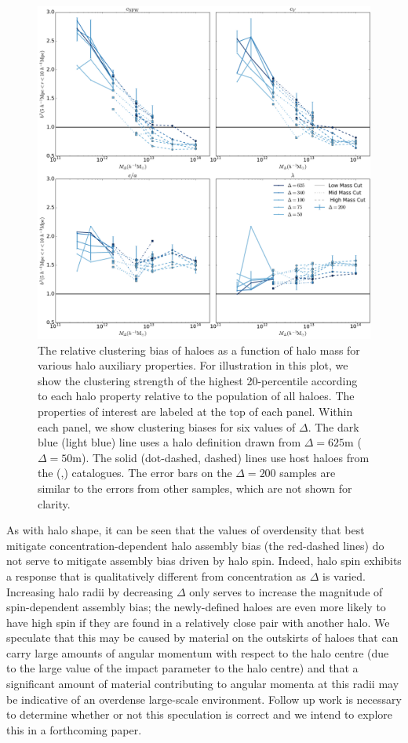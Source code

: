 \documentclass[usenatbib,fleqn]{mnras}
\begin{document}
\begin{figure}
	\centering
	\includegraphics[width=\textwidth]{biasplot.pdf}
	\caption{
The relative clustering bias of haloes as a function of halo mass for various halo auxiliary properties. For illustration in this plot, we show the clustering strength of the highest 20-percentile according to each halo property relative to the population of all haloes. The properties of interest are labeled at the top of each panel. Within each panel, we show clustering biases for six values of $\Delta$. The dark blue (light blue) line uses a halo definition drawn from $\Delta = 625$m ($\Delta = 50$m). The solid (dot-dashed, dashed) lines use host haloes from the \simA (\simB,\simC) catalogues. The error bars on the $\Delta=200$ samples are similar to the errors from other samples, which are not shown for clarity.
}
\label{fig:biascompare}
\end{figure}

As with halo shape, it can be seen that the values of overdensity that best mitigate concentration-dependent halo assembly bias (the red-dashed lines) do not serve to mitigate assembly bias driven by halo spin. Indeed, halo spin exhibits a response that is qualitatively different from concentration as $\Delta$ is varied. Increasing halo radii by decreasing $\Delta$ only serves to increase the magnitude of spin-dependent assembly bias; the newly-defined haloes are even more likely to have high spin if they are found in a relatively close pair with another halo. We speculate that this may be caused by material on the outskirts of haloes that can carry large amounts of angular momentum with respect to the halo centre (due to the large value of the impact parameter to the halo centre) and that a significant amount of material contributing to angular momenta at this radii may be indicative of an overdense large-scale environment. Follow up work is necessary to determine whether or not this speculation is correct and we intend to explore this in a forthcoming paper.
\end{document}
